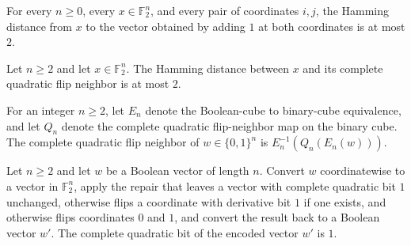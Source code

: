 \begin{theorem}
\label{FABL.hammingDist_add_two_single_le_two}
\leanok
{}
For every $n\ge 0$, every $x\in\mathbb F_2^n$, and every pair of coordinates $i,j$, the
Hamming distance from $x$ to the vector obtained by adding $1$ at both coordinates is at
most $2$.
\end{theorem}

\begin{theorem}
\label{FABL.hammingDist_completeQuadraticFlipNeighborBinary_le_two}
\leanok
{}
Let $n\ge 2$ and let $x\in\mathbb F_2^n$. The Hamming distance between $x$ and its
complete quadratic flip neighbor is at most $2$.
\end{theorem}

\begin{definition}
\label{FABL.completeQuadraticFlipNeighbor}
\leanok
{}
For an integer $n\ge 2$, let $E_n$ denote the Boolean-cube to binary-cube equivalence,
and let $Q_n$ denote the complete quadratic flip-neighbor map on the binary cube. The
complete quadratic flip neighbor of $w\in\{0,1\}^n$ is $E_n^{-1}(Q_n(E_n(w)))$.
\end{definition}

\begin{theorem}
\label{FABL.completeQuadraticFlipNeighbor_isCompleteQuadraticOne}
\leanok
{}
Let $n\ge 2$ and let $w$ be a Boolean vector of length $n$. Convert $w$ coordinatewise
to a vector in $\mathbb{F}_2^n$, apply the repair that leaves a vector with complete
quadratic bit $1$ unchanged, otherwise flips a coordinate with derivative bit $1$ if one
exists, and otherwise flips coordinates $0$ and $1$, and convert the result back to a
Boolean vector $w'$. The complete quadratic bit of the encoded vector $w'$ is $1$.
\end{theorem}

